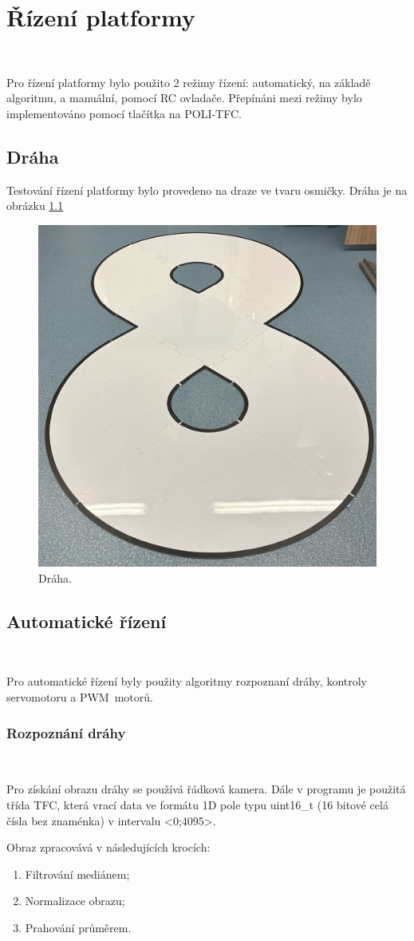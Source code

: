 \chapter{Řízení platformy}
\label{sec:PlatformControl}
\

Pro řízení platformy bylo použito 2 režimy řízení: automatický,
na základě algoritmu, a manuální, pomocí RC ovladače.
Přepínáni mezi režimy bylo implementováno
pomocí tlačítka na POLI-TFC.

\section{Dráha}
Testování řízení platformy bylo provedeno na draze ve tvaru osmičky.
Dráha je na obrázku \ref{fig:Road}

\begin{figure}[!htbp]
    \centering
    \includegraphics[width = 0.5\linewidth]{Figures/Road.png}
    \caption{Dráha.}
    \label{fig:Road}
\end{figure}

\section{Automatické řízení}\

Pro automatické řízení byly použity algoritmy rozpoznaní dráhy,
kontroly servomotoru a PWM~motorů.

\subsection{Rozpoznání dráhy}\

Pro získání obrazu dráhy se používá řádková kamera. Dále v programu
je použitá třída TFC\cite{draha}, která vrací data ve formátu 1D pole
typu uint16\_t (16 bitové celá čísla bez znaménka) v intervalu <0;4095>.

Obraz zpracovává v následujících krocích:
\begin{enumerate}
    \item Filtrování mediánem;
    \item Normalizace obrazu;
    \item Prahování průměrem.
\end{enumerate}

